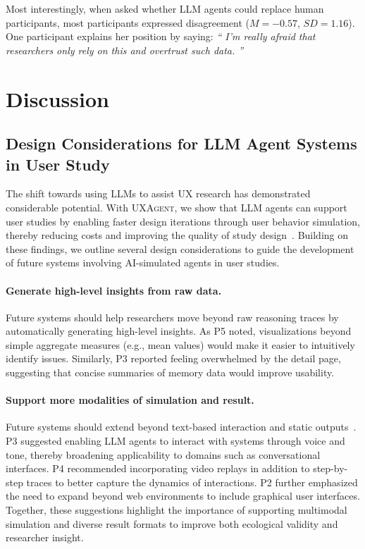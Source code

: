 \documentclass[manuscript,review,anonymous]{acmart}
\let\oldquote\quote
\let\oldendquote\endquote
\renewenvironment{quote}[1][]{
\def\speakername{#1}%
\oldquote
\itshape
``}{''
\normalshape
\hfill\ifthenelse{\equal{\speakername}{}}{}{(\speakername)}
\oldendquote
}
\DeclareRobustCommand{\projectname}{\textsc{UXAgent}\xspace}
\begin{document}
Most interestingly, when asked whether LLM agents could replace human participants, most participants expressed disagreement ($M=-0.57$, $SD=1.16$). 
One participant explains her position by saying:
\begin{quote}[P1]
I'm really afraid that researchers only rely on this and overtrust such data.
\end{quote}

\section{Discussion}

\subsection{Design Considerations for  LLM Agent Systems in User Study}
\label{sec:discussion-design-considerations}

The shift towards using LLMs to assist UX research has demonstrated considerable potential. With \projectname, we show that LLM agents can support user studies by enabling faster design iterations through user behavior simulation, thereby reducing costs and improving the quality of study design~\cite{decker-maurerMethodMadnessUsability2012}. Building on these findings, we outline several design considerations to guide the development of future systems involving AI-simulated agents in user studies.  

\paragraph{Generate high-level insights from raw data.}  
Future systems should help researchers move beyond raw reasoning traces by automatically generating high-level insights. As P5 noted, visualizations beyond simple aggregate measures (e.g., mean values) would make it easier to intuitively identify issues. Similarly, P3 reported feeling overwhelmed by the detail page, suggesting that concise summaries of memory data would improve usability.  

\paragraph{Support more modalities of simulation and result.}  
Future systems should extend beyond text-based interaction and static outputs~\cite{liu2025personaflow, kuangCollaborationConversationalAI2023}. P3 suggested enabling LLM agents to interact with systems through voice and tone, thereby broadening applicability to domains such as conversational interfaces. P4 recommended incorporating video replays in addition to step-by-step traces to better capture the dynamics of interactions. P2 further emphasized the need to expand beyond web environments to include graphical user interfaces. Together, these suggestions highlight the importance of supporting multimodal simulation and diverse result formats to improve both ecological validity and researcher insight.  
\end{document}
